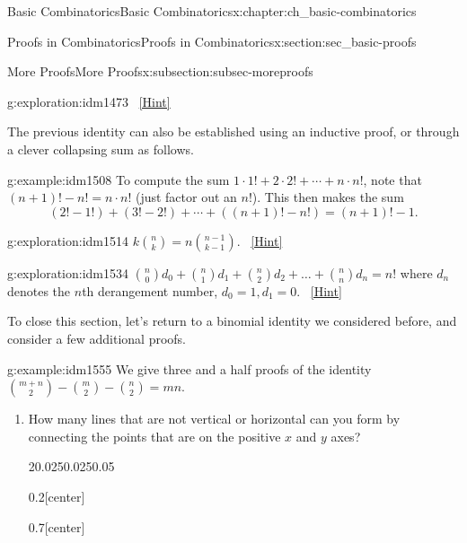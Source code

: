 \documentclass[oneside,10pt,]{book}
\numberwithin{equation}{chapter}
\begin{document}
\begin{chapterptx}{Basic Combinatorics}{}{Basic Combinatorics}{}{}{x:chapter:ch_basic-combinatorics}
\begin{sectionptx}{Proofs in Combinatorics}{}{Proofs in Combinatorics}{}{}{x:section:sec_basic-proofs}
\begin{subsectionptx}{More Proofs}{}{More Proofs}{}{}{x:subsection:subsec-moreproofs}
\begin{exploration}{}{g:exploration:idm1473}
\qquad~\hfill{\tiny\hyperlink{g:hint:idm1477-back}{[Hint]}}\end{exploration}
The previous identity can also be established using an inductive proof, or through a clever collapsing sum as follows.%
\begin{example}{}{g:example:idm1508}%
To compute the sum \(1\cdot 1! + 2 \cdot 2! + \cdots + n \cdot n!\), note that \((n+1)! - n! = n\cdot n!\) (just factor out an \(n!\)).  This then makes the sum%
\begin{equation*}
(2! - 1!) + (3! - 2!) + \cdots + ((n+1)! - n!) = (n+1)! - 1 \text{.}
\end{equation*}
%
\end{example}
\begin{exploration}{}{g:exploration:idm1514}%
\(k \binom{n}{k} = n \binom{n - 1}{k - 1}\).%
\qquad~\hfill{\tiny\hyperlink{g:hint:idm1518-back}{[Hint]}}\end{exploration}
\begin{exploration}{}{g:exploration:idm1534}%
\(\binom{n}{0} d_{0} + \binom{n}{1} d_{1} + \binom{n}{2} d_{2} + \ldots + \binom{n}{n} d_{n} = n!\) where \(d_{n}\) denotes the \(n\)th derangement number, \(d_{0} = 1,d_{1} = 0\).%
\qquad~\hfill{\tiny\hyperlink{g:hint:idm1541-back}{[Hint]}}\end{exploration}
To close this section, let's return to a binomial identity we considered before, and consider a few additional proofs.%
\begin{example}{}{g:example:idm1555}%
We give three and a half proofs of the identity \(\binom{m + n}{2} - \binom{m}{2} - \binom{n}{2} = mn\).%
\begin{enumerate}
\item{}How many lines that are not vertical or horizontal can you form by connecting the points that are on the positive \(x\) and \(y\) axes?%
\begin{sidebyside}{2}{0.025}{0.025}{0.05}%
\begin{sbspanel}{0.2}[center]%
%
\end{sbspanel}%
\begin{sbspanel}{0.7}[center]%

\end{sbspanel}
\end{sidebyside}
\end{enumerate}
\end{example}
\end{subsectionptx}
\end{sectionptx}
\end{chapterptx}
\end{document}
